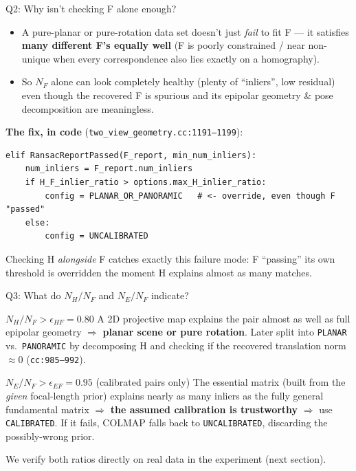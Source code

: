 \documentclass[11pt]{beamer}
\newcommand{\coderef}[1]{{\scriptsize\textcolor{blue!60!black}{\texttt{#1}}}}
\begin{document}
\begin{frame}[fragile]{Q2: Why isn't checking F alone enough?}
  \begin{itemize}
    \item A pure-planar or pure-rotation data set doesn't just \emph{fail} to fit F --- it satisfies \textbf{many different F's equally well} (F is poorly constrained / near non-unique when every correspondence also lies exactly on a homography).
    \item So $N_F$ alone can look completely healthy (plenty of ``inliers'', low residual) even though the recovered F is spurious and its epipolar geometry \& pose decomposition are meaningless.
  \end{itemize}
  \textbf{The fix, in code} (\coderef{two\_view\_geometry.cc:1191--1199}):
  \begin{lstlisting}
elif RansacReportPassed(F_report, min_num_inliers):
    num_inliers = F_report.num_inliers
    if H_F_inlier_ratio > options.max_H_inlier_ratio:
        config = PLANAR_OR_PANORAMIC   # <- override, even though F "passed"
    else:
        config = UNCALIBRATED
  \end{lstlisting}
  Checking H \emph{alongside} F catches exactly this failure mode: F ``passing'' its own threshold is overridden the moment H explains almost as many matches.
\end{frame}

\begin{frame}{Q3: What do $N_H/N_F$ and $N_E/N_F$ indicate?}
  \begin{block}{$N_H/N_F > \epsilon_{HF}=0.80$}
    A 2D projective map explains the pair almost as well as full epipolar geometry
    $\Rightarrow$ \textbf{planar scene or pure rotation}. Later split into \texttt{PLANAR} vs.\ \texttt{PANORAMIC}
    by decomposing H and checking if the recovered translation norm $\approx 0$
    (\coderef{cc:985--992}).
  \end{block}
  \begin{block}{$N_E/N_F > \epsilon_{EF}=0.95$ (calibrated pairs only)}
    The essential matrix (built from the \emph{given} focal-length prior) explains
    nearly as many inliers as the fully general fundamental matrix
    $\Rightarrow$ \textbf{the assumed calibration is trustworthy} $\Rightarrow$ use \texttt{CALIBRATED}.
    If it fails, COLMAP falls back to \texttt{UNCALIBRATED}, discarding the possibly-wrong prior.
  \end{block}
  We verify both ratios directly on real data in the experiment (next section).
\end{frame}
\end{document}
